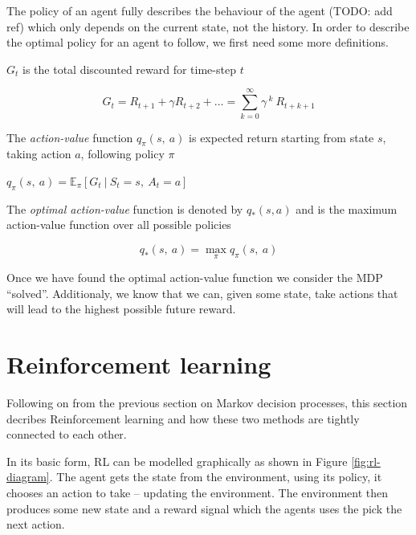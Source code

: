 The policy of an agent fully describes the behaviour of the agent (TODO: add ref) which only depends on the current state, not the history. In order to describe the optimal policy for an agent to follow, we first need some more definitions.

\begin{defn}
	$G_t$ is the total discounted reward for time-step $t$
	\vspace*{-7mm}
	\begin{center}
		$$G_t = R_{t+1} + \gamma R_{t+2} + \dots = \sum_{k=0}^{\infty}\gamma^{~k}~R_{t+k+1}$$
	\end{center}
\end{defn}

\begin{defn}
	The \textit{action-value} function $q_\pi(s,~a)$ is expected return starting from state $s$, taking action $a$, following policy $\pi$
	\begin{center}
		$q_\pi(s,~a)=\mathbb{E}_\pi[G_t~|~S_t=s,~A_t=a]$
	\end{center}
\end{defn}

\begin{defn}
	The \textit{optimal action-value} function is denoted by $q_*(s, a)$ and is the maximum action-value function over all possible policies
	\vspace*{-7mm}
	\begin{center}
		$$q_*(s,~a)=\max_\pi q_\pi(s,~a)$$
	\end{center}
\end{defn}

Once we have found the optimal action-value function we consider the MDP ``solved''. Additionaly, we know that we can, given some state, take actions that will lead to the highest possible future reward.

\section{Reinforcement learning}
\label{dsgn:sec:rl}
Following on from the previous section on Markov decision processes, this section decribes Reinforcement learning and how these two methods are tightly connected to each other.

In its basic form, RL can be modelled graphically as shown in Figure \ref{fig:rl-diagram}. The agent gets the state from the environment, using its policy, it chooses an action to take -- updating the environment. The environment then produces some new state and a reward signal which the agents uses the pick the next action.

